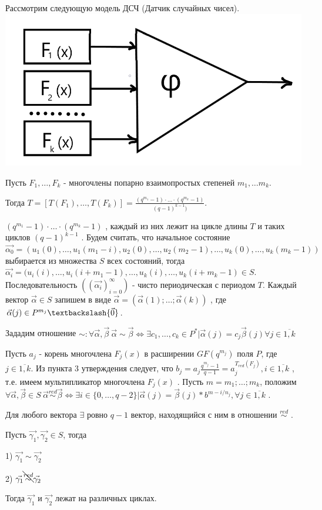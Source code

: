 Рассмотрим следующую модель ДСЧ (Датчик случайных чисел).\\

\includegraphics[scale=0.35]{DSC}

Пусть $F_1, \dots, F_k$ - многочлены попарно взаимопростых степеней $m_1, \dots m_k$.

Тогда $T=[T(F_1), \dots, T(F_k)] = \frac{(q^{m_1} - 1) \cdot \ldots \cdot (q^{m_k} - 1)}{(q-1)^{k-1})}$.

$(q^{m_1} - 1) \cdot \dotsc \cdot (q^{m_k} - 1)$ , каждый из них лежит на цикле длины $T$ и таких циклов $(q-1)^{k-1}$ . Будем считать, что начальное состояние $\vec{\alpha_0} = (u_1(0), \dots, u_1(m_1 - i),u_2(0),\dotsc, u_2(m_2-1), \dots, u_k(0), \dots, u_k(m_k-1))$ выбирается из множества $S$ всех состояний, тогда $\vec{\alpha_i}=(u_i(i), \dots, u_i(i+m_1-1), \dots, u_k(i), \dots, u_k(i+m_k-1) \in S$.
 Последовательность $((\vec{\alpha_i})_{i=0}^{\infty})$ - чисто периодическая с периодом $T$.
Каждый вектор $\vec{\alpha} \in S$ запишем в виде $\vec{\alpha} = (\vec{\alpha}(1); \dots; \vec{\alpha}(k))$ , где $\vec{\alpha}(j) \in P^{m_j} \textbackslash \{\vec{0}\}$.

Зададим отношение $\sim : \forall \vec{\alpha}, \vec{\beta} \: \vec{\alpha}\sim\vec{\beta} \Leftrightarrow \exists c_1, \dots, c_k \in P^*|\vec{\alpha}(j) = c_j \vec{\beta}(j) \forall j \in \overline{1,k}$

Пусть $a_j$ - корень многочлена $F_j(x)$ в расширении $GF(q^{m_j})$ поля $P$, где $j \in \overline{1,k}$. Из пункта 3 утверждения следует, что $b_j = a_j \frac{q^{m_j}-1}{q-1} = a_j^{T_{red}(F_j)}, i \in \overline{1,k}$ , т.е. имеем мультипликатор многочлена $F_j(x)$ . Пусть $m=m_1; \dots; m_k$, положим $\forall \vec{\alpha}, \vec{\beta} \in S \: \vec{\alpha} \stackrel{red}{\sim} \vec{\beta} \Leftrightarrow \exists i \in \{0, \dots, q-2\} | \vec{\alpha}(j) = \vec{\beta}(j) * b^{m-i/n_j}, \forall j \in \overline{1,k}$ .

Для любого вектора $\exists$ ровно $q-1$ вектор, находящийся с ним в отношении $\stackrel{red}{\sim}$ .

\thr
Пусть $\vec{\gamma_1}, \vec{\gamma_2} \in S$, тогда

1) $\vec{\gamma_1} \sim \vec{\gamma_2}$

2) $\vec{\gamma_1} \bcancel{\stackrel{red}{\sim}} \vec{\gamma_2}$%

Тогда $\vec{\gamma_1}$ и $\vec{\gamma_2}$ лежат на различных циклах. 